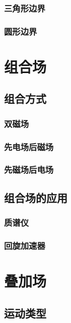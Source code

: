 \documentclass[a4paper,12pt,twoside]{article}
\begin{document}
\subsubsection{三角形边界}

\subsubsection{圆形边界}


\section{组合场}

\subsection{组合方式}

\subsubsection{双磁场}

\subsubsection{先电场后磁场}

\subsubsection{先磁场后电场}

\subsection{组合场的应用}

\subsubsection{质谱仪}

\subsubsection{回旋加速器}


\section{叠加场}

\subsection{运动类型}
\end{document}
